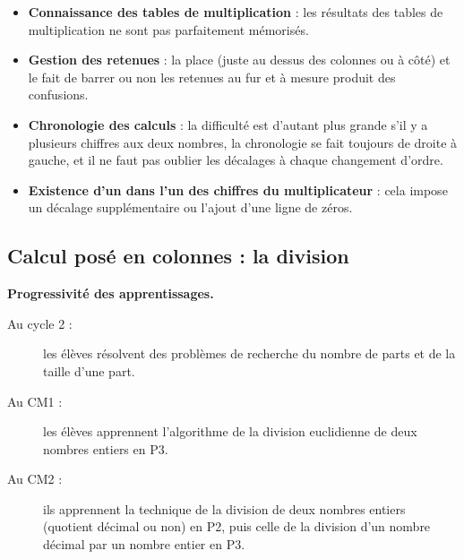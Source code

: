 \bigskip


{\renewcommand{\StringDOCUMENTATION}{Difficultés rencontrées par les élèves :}
\begin{documentation}
   \begin{itemize}
      \item {\bf Connaissance des tables de multiplication} : les résultats des tables de multiplication ne sont pas parfaitement mémorisés.
      \item {\bf Gestion des retenues} : la place (juste au dessus des \og colonnes \fg{} ou à côté) et le fait de barrer ou non les retenues au fur et à mesure produit des confusions.
   \item {\bf Chronologie des calculs} : la difficulté est d'autant plus grande s'il y a plusieurs chiffres aux deux nombres, la chronologie se fait toujours de droite à gauche, et il ne faut pas oublier les décalages à chaque changement d'ordre.
      \item {\bf Existence d'un  \fg{} dans l'un des chiffres du multiplicateur} : cela impose un décalage supplémentaire ou l'ajout d'une ligne de zéros. \\ [-8mm]
   \end{itemize}
\end{documentation}}

\newpage

\subsection{Calcul posé en colonnes : la division} %


{\bf Progressivité des apprentissages.} 
\begin{description}
   \item[Au cycle 2 :] les élèves résolvent des problèmes de recherche du nombre de parts et de la taille d’une part.
   \item[Au CM1 :] les élèves apprennent l’algorithme de la division euclidienne de deux nombres entiers en P3.
   \item[Au CM2 :] ils apprennent la technique de la division de deux nombres entiers (quotient décimal ou non) en P2, puis celle de la division d’un nombre décimal par un nombre entier en P3.
\end{description}

